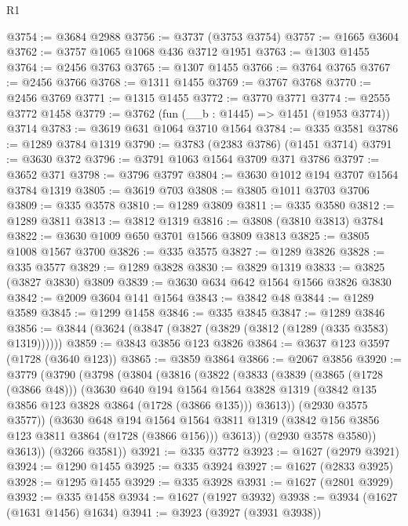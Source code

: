 \begin{lexlean}{R1}
\begin{coremodule}
@3754 := @3684 @2988
@3756 := @3737 (@3753 @3754)
@3757 := @1665 @3604
@3762 := @3757 @1065 @1068 @436 @3712 @1951
@3763 := @1303 @1455
@3764 := @2456 @3763
@3765 := @1307 @1455
@3766 := @3764 @3765
@3767 := @2456 @3766
@3768 := @1311 @1455
@3769 := @3767 @3768
@3770 := @2456 @3769
@3771 := @1315 @1455
@3772 := @3770 @3771
@3774 := @2555 @3772 @1458
@3779 := @3762 (fun (__b : @1445) => @1451 (@1953 @3774)) @3714
@3783 := @3619 @631 @1064 @3710 @1564
@3784 := @335 @3581
@3786 := @1289 @3784 @1319
@3790 := @3783 (@2383 @3786) (@1451 @3714)
@3791 := @3630 @372
@3796 := @3791 @1063 @1564 @3709 @371 @3786
@3797 := @3652 @371
@3798 := @3796 @3797
@3804 := @3630 @1012 @194 @3707 @1564 @3784 @1319
@3805 := @3619 @703
@3808 := @3805 @1011 @3703 @3706
@3809 := @335 @3578
@3810 := @1289 @3809
@3811 := @335 @3580
@3812 := @1289 @3811
@3813 := @3812 @1319
@3816 := @3808 (@3810 @3813) @3784
@3822 := @3630 @1009 @650 @3701 @1566 @3809 @3813
@3825 := @3805 @1008 @1567 @3700
@3826 := @335 @3575
@3827 := @1289 @3826
@3828 := @335 @3577
@3829 := @1289 @3828
@3830 := @3829 @1319
@3833 := @3825 (@3827 @3830) @3809
@3839 := @3630 @634 @642 @1564 @1566 @3826 @3830
@3842 := @2009 @3604 @141 @1564
@3843 := @3842 @48
@3844 := @1289 @3589
@3845 := @1299 @1458
@3846 := @335 @3845
@3847 := @1289 @3846
@3856 := @3844 (@3624 (@3847 (@3827 (@3829 (@3812 (@1289 (@335 @3583) @1319))))))
@3859 := @3843 @3856 @123 @3826
@3864 := @3637 @123 @3597 (@1728 (@3640 @123))
@3865 := @3859 @3864
@3866 := @2067 @3856
@3920 := @3779
    (@3790
      (@3798
        (@3804
          (@3816
            (@3822
              (@3833
                (@3839
                  (@3865 (@1728 (@3866 @48)))
                  (@3630
                    @640
                    @194
                    @1564
                    @1564
                    @3828
                    @1319
                    (@3842 @135 @3856 @123 @3828 @3864 (@1728 (@3866 @135)))
                    @3613))
                (@2930 @3575 @3577))
              (@3630
                @648
                @194
                @1564
                @1564
                @3811
                @1319
                (@3842 @156 @3856 @123 @3811 @3864 (@1728 (@3866 @156)))
                @3613))
            (@2930 @3578 @3580))
          @3613))
      (@3266 @3581))
@3921 := @335 @3772
@3923 := @1627 (@2979 @3921)
@3924 := @1290 @1455
@3925 := @335 @3924
@3927 := @1627 (@2833 @3925)
@3928 := @1295 @1455
@3929 := @335 @3928
@3931 := @1627 (@2801 @3929)
@3932 := @335 @1458
@3934 := @1627 (@1927 @3932)
@3938 := @3934 (@1627 (@1631 @1456) @1634)
@3941 := @3923 (@3927 (@3931 @3938))

\end{coremodule}
\end{lexlean}
